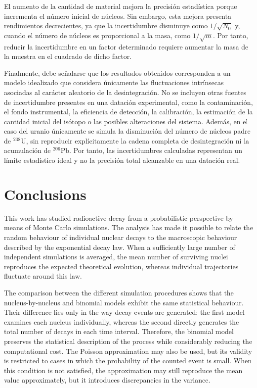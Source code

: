\documentclass[12pt,a4paper]{article}
\begin{document}
El aumento de la cantidad de material mejora la precisión estadística porque incrementa el número inicial de núcleos. Sin embargo, esta mejora presenta rendimientos decrecientes, ya que la incertidumbre disminuye como $1/\sqrt{N_0}$ y, cuando el número de núcleos es proporcional a la masa, como $1/\sqrt{m}$. Por tanto, reducir la incertidumbre en un factor determinado requiere aumentar la masa de la muestra en el cuadrado de dicho factor.

Finalmente, debe señalarse que los resultados obtenidos corresponden a un modelo idealizado que considera únicamente las fluctuaciones intrínsecas asociadas al carácter aleatorio de la desintegración. No se incluyen otras fuentes de incertidumbre presentes en una datación experimental, como la contaminación, el fondo instrumental, la eficiencia de detección, la calibración, la estimación de la cantidad inicial del isótopo o las posibles alteraciones del sistema. Además, en el caso del uranio únicamente se simula la disminución del número de núcleos padre de $^{238}\text{U}$, sin reproducir explícitamente la cadena completa de desintegración ni la acumulación de $^{206}\text{Pb}$. Por tanto, las incertidumbres calculadas representan un límite estadístico ideal y no la precisión total alcanzable en una datación real.


\newpage
\section{Conclusions}

This work has studied radioactive decay from a probabilistic perspective by means of Monte Carlo simulations. The analysis has made it possible to relate the random behaviour of individual nuclear decays to the macroscopic behaviour described by the exponential decay law. When a sufficiently large number of independent simulations is averaged, the mean number of surviving nuclei reproduces the expected theoretical evolution, whereas individual trajectories fluctuate around this law.

The comparison between the different simulation procedures shows that the nucleus-by-nucleus and binomial models exhibit the same statistical behaviour. Their difference lies only in the way decay events are generated: the first model examines each nucleus individually, whereas the second directly generates the total number of decays in each time interval. Therefore, the binomial model preserves the statistical description of the process while considerably reducing the computational cost. The Poisson approximation may also be used, but its validity is restricted to cases in which the probability of the counted event is small. When this condition is not satisfied, the approximation may still reproduce the mean value approximately, but it introduces discrepancies in the variance.
\end{document}
